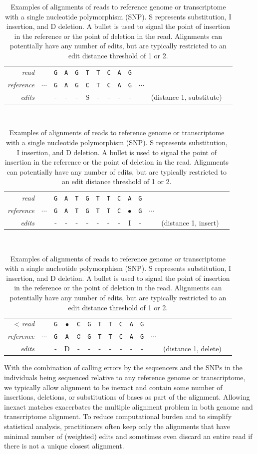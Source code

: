 \documentclass[11pt]{report}
\newcommand{\mybase}[1]{\texttt{#1}\xspace}
\newcommand{\baseA}{\mybase{A}}
\newcommand{\baseC}{\mybase{C}}
\newcommand{\baseG}{\mybase{G}}
\newcommand{\baseT}{\mybase{T}}
\newcommand{\mycaption}[2]{\caption{#2}\label{#1}}
\begin{document}
\begin{table}[t!]
  \centering\small
  \begin{tabular}{r|cccccccccccl}
    \textit{read} & & \baseG & \baseA & \baseG & \baseT & \baseT & \baseC & \baseA & \baseG
    \\
    \textit{reference} & $\cdots$ & \baseG & \baseA & \baseG & \baseC & \baseT & \baseC & \baseA & \baseG & $\cdots$
    \\ \hline
    \textit{edits} &  & - & - & - & \small S & - & - & - & - &  & \small (distance 1, substitute)
  \end{tabular}
  \\[12pt]
  \begin{tabular}{r|ccccccccccccl}
    \textit{read} & & \baseG & \baseA &\baseT & \baseG & \baseT & \baseT & \baseC & \baseA & \baseG &
    \\
    \textit{reference} & $\cdots$ & \baseG & \baseA & \baseT & \baseG & \baseT & \baseT & \baseC & $\bullet$ & \baseG & $\cdots$
    \\ \hline
    \textit{edits} & & - & - & - & - & - & - & - & \small I & - & & \small (distance 1, insert)
  \end{tabular}
  \\[12pt]
  \begin{tabular}{r|ccccccccccccl}
<    \textit{read} & & \baseG & $\bullet$ & \baseC & \baseG & \baseT & \baseT & \baseC & \baseA & \baseG &
    \\
    \textit{reference} & $\cdots$ & \baseG & \baseA & $\baseC$ & \baseG & \baseT & \baseT & \baseC & \baseA & \baseG & $\cdots$
    \\ \hline
    \textit{edits} & & - & \small D & - & - & - & - & - & - & - & & \small (distance 1, delete)
  \end{tabular}
  \mycaption{tab:edit-distance}{Examples of alignments of reads to
    reference genome or transcriptome with a single nucleotide
    polymorphism (SNP). S represents substitution, I insertion, and D
    deletion. A bullet is used to signal the point of insertion in the
    reference or the point of deletion in the read. Alignments can
    potentially have any number of edits, but are typically restricted
    to an edit distance threshold of 1 or 2.}
\end{table}

With the combination of calling errors by the sequencers and the SNPs
in the individuals being sequenced relative to any reference genome or
transcriptome, we typically allow alignment to be inexact and contain
some number of insertions, deletions, or substitutions of bases as
part of the alignment. Allowing inexact matches exacerbates the
multiple alignment problem in both genome and transcriptome alignment.
To reduce computational burden and to simplify statistical analysis,
practitioners often keep only the alignments that have minimal number
of (weighted) edits and sometimes even discard an entire read if there
is not a unique closest alignment.
\end{document}
